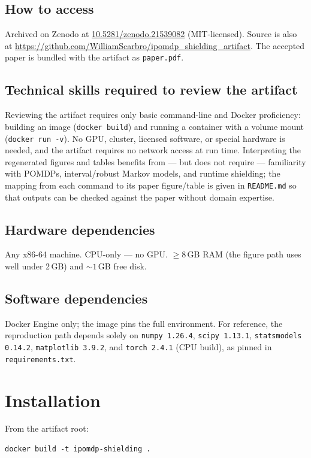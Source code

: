 \documentclass[10pt]{article}
\newcommand{\code}[1]{\texttt{#1}}
\begin{document}
\subsection*{How to access}
Archived on Zenodo at \href{https://doi.org/10.5281/zenodo.21539082}{10.5281/zenodo.21539082}
(MIT-licensed). Source is also at
\url{https://github.com/WilliamScarbro/ipomdp_shielding_artifact}. The accepted
paper is bundled with the artifact as \code{paper.pdf}.

\subsection*{Technical skills required to review the artifact}
Reviewing the artifact requires only basic command-line and Docker proficiency:
building an image (\code{docker build}) and running a container with a volume
mount (\code{docker run -v}). No GPU, cluster, licensed software, or special
hardware is needed, and the artifact requires no network access at run time.
Interpreting the regenerated figures and tables benefits from --- but does not
require --- familiarity with POMDPs, interval/robust Markov models, and runtime
shielding; the mapping from each command to its paper figure/table is given in
\code{README.md} so that outputs can be checked against the paper without domain
expertise.

\subsection*{Hardware dependencies}
Any x86-64 machine. CPU-only --- no GPU. ${\ge}8$\,GB RAM (the figure path uses
well under 2\,GB) and ${\sim}1$\,GB free disk.

\subsection*{Software dependencies}
Docker Engine only; the image pins the full environment. For reference, the
reproduction path depends solely on \code{numpy 1.26.4}, \code{scipy 1.13.1},
\code{statsmodels 0.14.2}, \code{matplotlib 3.9.2}, and \code{torch 2.4.1} (CPU
build), as pinned in \code{requirements.txt}.

\section*{Installation}
From the artifact root:
\begin{verbatim}
docker build -t ipomdp-shielding .
\end{verbatim}
\end{document}

